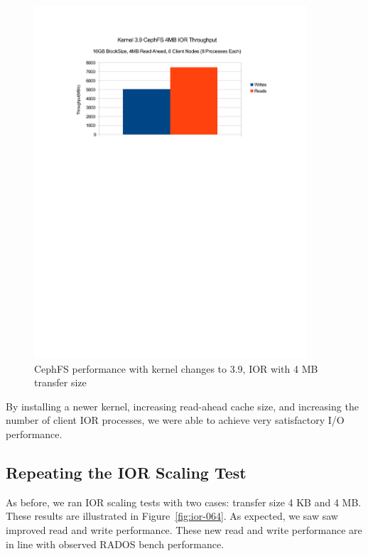 \documentclass{article}
\begin{document}
\begin{figure}[htb]
\centering
\includegraphics[width=4in]{ior-kernel-39}
\caption{CephFS performance with kernel changes to 3.9, IOR with 4 MB transfer
size}
\label{fig:ior-kernel-39}
\end{figure}


By installing a newer kernel, increasing read-ahead cache size, and increasing the number of
client IOR processes, we were able to achieve very satisfactory I/O performance.


\subsection{Repeating the IOR Scaling Test}

As before, we ran IOR scaling tests with two cases: transfer size 4 KB and 4 MB.
These results are illustrated in Figure~\ref{fig:ior-064}. As expected, we saw
saw  improved read and write performance. These new read and write performance are in
line with observed RADOS bench performance.

\end{document}
